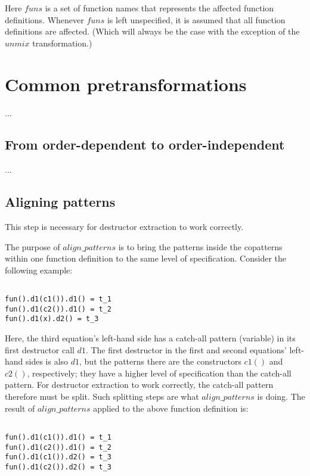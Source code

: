 Here $funs$ is a set of function names that represents the affected function definitions. Whenever $funs$ is left unspecified, it is assumed that all function definitions are affected. (Which will always be the case with the exception of the $unmix$ transformation.)

\section{Common pretransformations}

...

\subsection{From order-dependent to order-independent}

...

\subsection{Aligning patterns}

This step is necessary for destructor extraction to work correctly.

The purpose of $align\_patterns$ is to bring the patterns inside the copatterns within one function definition to the same level of specification. Consider the following example:

\begin{lstlisting}

fun().d1(c1()).d1() = t_1
fun().d1(c2()).d1() = t_2
fun().d1(x).d2() = t_3

\end{lstlisting}

Here, the third equation's left-hand side has a catch-all pattern (variable) in its first destructor call $d1$. The first destructor in the first and second equations' left-hand sides is also $d1$, but the patterns there are the constructors $c1()$ and $c2()$, respectively; they have a higher level of specification than the catch-all pattern. For destructor extraction to work correctly, the catch-all pattern therefore must be split. Such splitting steps are what $align\_patterns$ is doing. The result of $align\_patterns$ applied to the above function definition is:

\begin{lstlisting}

fun().d1(c1()).d1() = t_1
fun().d1(c2()).d1() = t_2
fun().d1(c1()).d2() = t_3
fun().d1(c2()).d2() = t_3

\end{lstlisting}

